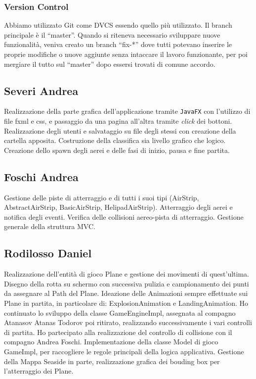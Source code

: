 \documentclass[a4paper,12pt]{report}
\begin{document}
\subsubsection{Version Control}
Abbiamo utilizzato Git come DVCS essendo quello più utilizzato.
Il branch principale è il “master”.
Quando si riteneva necessario sviluppare nuove funzionalità, veniva creato un branch “fix-*” dove tutti potevano inserire le proprie modifiche o nuove aggiunte senza intaccare il lavoro funzionante, per poi mergiare il tutto sul “master” dopo essersi trovati di comune accordo.
\subsection{Severi Andrea}
Realizzazione della parte grafica dell'applicazione tramite \texttt{JavaFX} con l'utilizzo di file fxml e css, e passaggio da una pagina all'altra tramite \textit{click} dei bottoni. 
\\
Realizzazione degli utenti e salvataggio su file degli stessi con creazione della cartella apposita. Costruzione della classifica sia livello grafico che logico. 
\\
Creazione dello spawn degli aerei e delle fasi di inizio, pausa e fine partita.

\subsection{Foschi Andrea}
Gestione delle piste di atterraggio e di tutti i suoi tipi (AirStrip, AbstractAirStrip, BasicAirStrip, HelipadAirStrip). Atterraggio degli aerei e notifica degli eventi. Verifica delle collisioni aereo-pista di atterraggio. Gestione generale della struttura MVC.

\subsection{Rodilosso Daniel}
Realizzazione dell’entità di gioco Plane e gestione dei movimenti di quest’ultima.
Disegno della rotta su schermo con successiva pulizia e campionamento dei punti da assegnare al Path del Plane.
Ideazione delle Animazioni sempre effettuate sui Plane in partita, in particolare di: ExplosionAnimation e LandingAnimation.
Ho continuato lo sviluppo della classe GameEngineImpl, assegnata al compagno Atanasov Atanas Todorov poi ritirato, realizzando successivamente i 
vari controlli di partita.
Ho partecipato alla realizzazione del controllo di collisione con il compagno Andrea Foschi.
Implementazione della classe Model di gioco GameImpl, per raccogliere le regole principali della logica applicativa.
Gestione della Mappa Seaside in parte, realizzazione grafica dei bouding box per l’atterraggio dei Plane.
\end{document}
